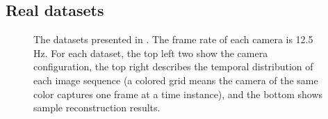 \subsection{Real datasets}
\begin{figure}
\centering
{}

\caption{The datasets presented in \cite{ballan2010unstructured}. The frame rate of each camera is 12.5 Hz. For each dataset, the top left two show the camera configuration, the top right describes the temporal distribution of each image sequence (a colored grid means the camera of the same color captures one frame at a time instance), and the bottom shows sample reconstruction results. }
\label{fig:onlinedata}
\end{figure}


